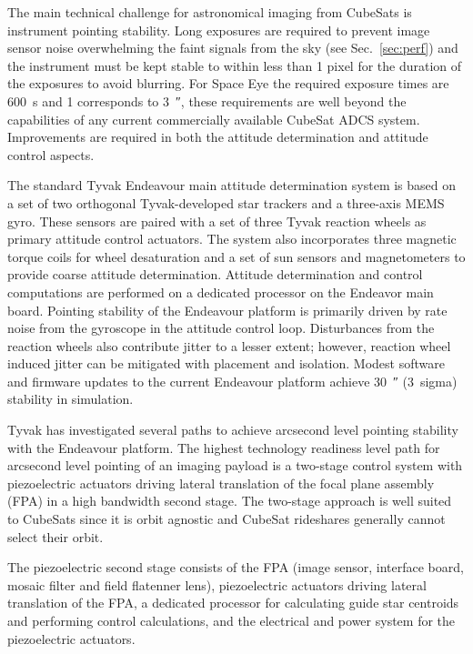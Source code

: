 \documentclass[]{iac}
\begin{document}
The main technical challenge for astronomical imaging from CubeSats is instrument pointing stability. Long exposures are
required to prevent image sensor noise overwhelming the faint signals from the sky (see Sec.~\ref{sec:perf}) and the
instrument must be kept stable to within less than 1 pixel for the duration of the exposures to avoid blurring.  For
Space Eye the required exposure times are \SI{600}{\second} and \SI{1}{\pix} corresponds to \SI{3}{\arcsecond}, these
requirements are well beyond the capabilities of any current commercially available CubeSat ADCS system.  Improvements
are required in both the attitude determination and attitude control aspects.

The standard Tyvak Endeavour main attitude determination system is based on a set of two orthogonal Tyvak-developed star
trackers and a three-axis MEMS gyro. These sensors are paired with a set of three Tyvak reaction wheels as primary
attitude control actuators. The system also incorporates three magnetic torque coils for wheel desaturation and a set of
sun sensors and magnetometers to provide coarse attitude determination. Attitude determination and control computations
are performed on a dedicated processor on the Endeavor main board. Pointing stability of the Endeavour platform is
primarily driven by rate noise from the gyroscope in the attitude control loop. Disturbances from the reaction wheels
also contribute jitter to a lesser extent; however, reaction wheel induced jitter can be mitigated with placement and
isolation. Modest software and firmware updates to the current Endeavour platform achieve \SI{30}{\arcsecond}
(\SI{3}{sigma}) stability in simulation.

Tyvak has investigated several paths to achieve arcsecond level pointing stability with the Endeavour platform. The
highest technology readiness level path for arcsecond level pointing of an imaging payload is a two-stage control system
with piezoelectric actuators driving lateral translation of the focal plane assembly (FPA) in a high bandwidth second
stage. The two-stage approach is well suited to CubeSats since it is orbit agnostic and CubeSat rideshares generally
cannot select their orbit.

The piezoelectric second stage consists of the FPA (image sensor, interface board, mosaic filter and field flatenner
lens), piezoelectric actuators driving lateral translation of the FPA, a dedicated processor for calculating guide star
centroids and performing control calculations, and the electrical and power system for the piezoelectric actuators.
\end{document}
